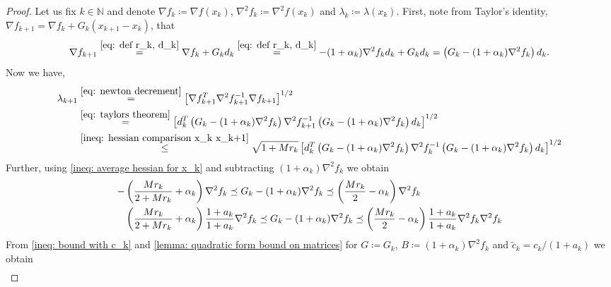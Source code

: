 \documentclass[sn-mathphys-num]{sn-jnl}%
\newcommand{\N}{\mathbb{N}}
\theoremstyle{thmstyleone}%
\theoremstyle{thmstyletwo}%
\theoremstyle{thmstylethree}%
\numberwithin{equation}{section}
\begin{document}
\begin{proof}
Let us fix $k \in \N$ and denote $ \nabla f_{k} \coloneq\nabla f(x_{k})$, $\nabla^2 f_{k} \coloneq\nabla^2 f(x_{k})$ and $\lambda_{k} \coloneq\lambda(x_{k})$.
First, note from Taylor's identity, $\nabla f_{k+1} = \nabla f_{k} + G_k (x_{k+1} - x_k)$, that
\begin{equation} \label{eq: taylors theorem}
    \nabla f_{k+1} \overset{\eqref{eq: def r_k, d_k}}{=} \nabla f_{k} + G_k d_k \overset{\eqref{eq: def r_k, d_k}}{=} -(1 + \alpha_k) \nabla^2 f_{k} d_k + G_k d_k = \left(G_k - (1 + \alpha_k) \nabla^2 f_{k}\right) d_k.
\end{equation}
Now we have, 
    \begin{equation} \label{ineq: lambda initial}
    \begin{split}
    \lambda_{k+1} & \overset{\eqref{eq: newton decrement}}{=} \left[\nabla f_{k+1}^T \nabla^2 f_{k+1}^{-1} \nabla f_{k+1}\right]^{1/2} \\
    & \overset{\eqref{eq: taylors theorem}}{=} \left[d_k^T \left(G_k - (1 + \alpha_k) \nabla^2 f_{k}\right) \nabla^2 f_{k+1}^{-1} \left(G_k - (1 + \alpha_k) \nabla^2 f_{k}\right) d_k \right]^{1/2} \\
    & \overset{\eqref{ineq: hessian comparison x_k x_k+1}}{\leq} \sqrt{1 + M r_k} 
\left[d_k^T \left(G_k - (1 + \alpha_k) \nabla^2 f_{k}\right) \nabla^2 f_{k}^{-1} \left(G_k - (1 + \alpha_k) \nabla^2 f_{k}\right) d_k \right]^{1/2}
    \end{split}
    \end{equation}
    Further, using \eqref{ineq: average hessian for x_k} and subtracting $(1 + \alpha_k)\nabla^2 f_{k}$ we obtain 
    \begin{align}
       - & \left( \frac{M r_k}{2 + M r_k} + \alpha_k \right) \nabla^2 f_{k} \preceq G_k - (1 + \alpha_k)\nabla^2 f_{k} \preceq \left( \frac{Mr_k}{2} - \alpha_k \right)\nabla^2 f_{k} \notag \\
       & \left( \frac{M r_k}{2 + M r_k} + \alpha_k \right) \frac{1 + a_k}{1 + a_k}\nabla^2 f_{k} \preceq G_k - (1 + \alpha_k)\nabla^2 f_{k} \preceq \left( \frac{Mr_k}{2} - \alpha_k \right) \frac{1 + a_k}{1 + a_k}\nabla^2 f_{k} \nabla^2 f_{k} \label{ineq: bound with c_k}
    \end{align}
    From \eqref{ineq: bound with c_k} and \cref{lemma: quadratic form bound on matrices} for $G\coloneq G_k$, $B \coloneq (1 + \alpha_k)\nabla^2 f_{k}$ and $\tilde{c}_k = c_k / (1+a_k)$ we obtain
    \begin{align}  \label{ineq: quadratic in theorem}

\end{align}
\end{proof}
\end{document}
